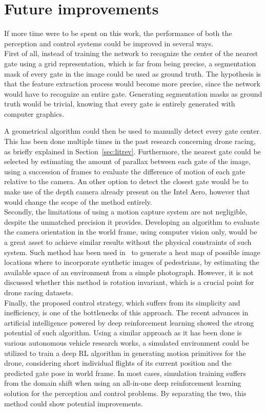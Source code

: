 \chapter{Future improvements}

If more time were to be spent on this work, the performance of both the
perception and control systems could be improved in several ways.\\

First of all, instead of training the network to recognize the center of the
nearest gate using a grid representation, which is far from being precise, a
segmentation mask of every gate in the image could be used as ground truth. The
hypothesis is that the feature extraction process would become more precise,
since the network would have to recognize an entire gate. Generating
segmentation masks as ground truth would be trivial, knowing that every gate is
entirely generated with computer graphics.

A geometrical algorithm could then be used to manually detect every gate
center. This has been done multiple times in the past research concerning drone
racing, as briefly explained in Section~\ref{sec:litrev}. Furthermore, the
nearest gate could be selected by estimating the amount of parallax between
each gate of the image, using a succession of frames to evaluate the difference
of motion of each gate relative to the camera. An other option to detect the
closest gate would be to make use of the depth camera already present on the
Intel Aero, however that would change the scope of the method entirely.\\

Secondly, the limitations of using a motion capture system are not negligible,
despite the unmatched precision it provides. Developing an algorithm to
evaluate the camera orientation in the world frame, using computer vision only,
would be a great asset to achieve similar results without the physical
constraints of such system. Such method has been used in~\cite{CheungWBM17} to
generate a heat map of possible image locations where to incorporate synthetic
images of pedestrians, by estimating the available space of an environment from
a simple photograph. However, it is not discussed whether this method is
rotation invariant, which is a crucial point for drone racing datasets.\\

Finally, the proposed control strategy, which suffers from its simplicity and
inefficiency, is one of the bottlenecks of this approach. The recent advances
in artificial intelligence powered by deep reinforcement learning showed the
strong potential of such algorithm. Using a similar approach as it has been
done is various autonomous vehicle research works, a simulated environment
could be utilized to train a deep RL algorithm in generating motion primitives
for the drone, considering short individual flights of its current position and
the predicted gate pose in world frame. In most cases, simulation training
suffers from the domain shift when using an all-in-one deep reinforcement
learning solution for the perception and control problems. By separating the
two, this method could show potential improvements.
